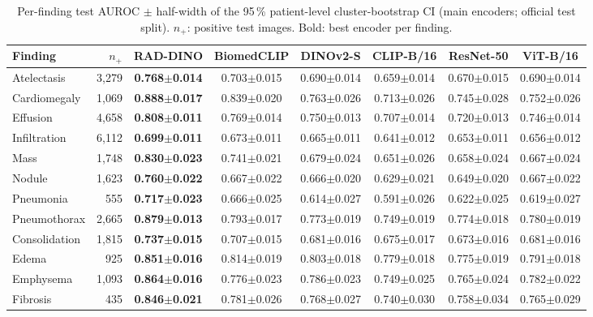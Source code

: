 \begin{table}[H]\centering
\scriptsize
\caption{Per-finding test AUROC $\pm$ half-width of the 95\,\% patient-level cluster-bootstrap CI (main encoders; official test split). $n_+$: positive test images. Bold: best encoder per finding.}\label{tab:perlabel}
\begin{adjustbox}{max width=\linewidth}
\begin{tabular}{lrcccccc}
\toprule
Finding & $n_+$ & RAD-DINO & BiomedCLIP & DINOv2-S & CLIP-B/16 & ResNet-50 & ViT-B/16 \\
\midrule
Atelectasis & 3,279 & \textbf{0.768$\pm$0.014} & 0.703$\pm$0.015 & 0.690$\pm$0.014 & 0.659$\pm$0.014 & 0.670$\pm$0.015 & 0.690$\pm$0.014 \\
Cardiomegaly & 1,069 & \textbf{0.888$\pm$0.017} & 0.839$\pm$0.020 & 0.763$\pm$0.026 & 0.713$\pm$0.026 & 0.745$\pm$0.028 & 0.752$\pm$0.026 \\
Effusion & 4,658 & \textbf{0.808$\pm$0.011} & 0.769$\pm$0.014 & 0.750$\pm$0.013 & 0.707$\pm$0.014 & 0.720$\pm$0.013 & 0.746$\pm$0.014 \\
Infiltration & 6,112 & \textbf{0.699$\pm$0.011} & 0.673$\pm$0.011 & 0.665$\pm$0.011 & 0.641$\pm$0.012 & 0.653$\pm$0.011 & 0.656$\pm$0.012 \\
Mass & 1,748 & \textbf{0.830$\pm$0.023} & 0.741$\pm$0.021 & 0.679$\pm$0.024 & 0.651$\pm$0.026 & 0.658$\pm$0.024 & 0.667$\pm$0.024 \\
Nodule & 1,623 & \textbf{0.760$\pm$0.022} & 0.667$\pm$0.022 & 0.666$\pm$0.020 & 0.629$\pm$0.021 & 0.649$\pm$0.020 & 0.667$\pm$0.022 \\
Pneumonia & 555 & \textbf{0.717$\pm$0.023} & 0.666$\pm$0.025 & 0.614$\pm$0.027 & 0.591$\pm$0.026 & 0.622$\pm$0.025 & 0.619$\pm$0.027 \\
Pneumothorax & 2,665 & \textbf{0.879$\pm$0.013} & 0.793$\pm$0.017 & 0.773$\pm$0.019 & 0.749$\pm$0.019 & 0.774$\pm$0.018 & 0.780$\pm$0.019 \\
Consolidation & 1,815 & \textbf{0.737$\pm$0.015} & 0.707$\pm$0.015 & 0.681$\pm$0.016 & 0.675$\pm$0.017 & 0.673$\pm$0.016 & 0.681$\pm$0.016 \\
Edema & 925 & \textbf{0.851$\pm$0.016} & 0.814$\pm$0.019 & 0.803$\pm$0.018 & 0.779$\pm$0.018 & 0.775$\pm$0.019 & 0.791$\pm$0.018 \\
Emphysema & 1,093 & \textbf{0.864$\pm$0.016} & 0.776$\pm$0.023 & 0.786$\pm$0.023 & 0.749$\pm$0.025 & 0.765$\pm$0.024 & 0.782$\pm$0.022 \\
Fibrosis & 435 & \textbf{0.846$\pm$0.021} & 0.781$\pm$0.026 & 0.768$\pm$0.027 & 0.740$\pm$0.030 & 0.758$\pm$0.034 & 0.765$\pm$0.029 \\

\end{tabular}
\end{adjustbox}
\end{table}
